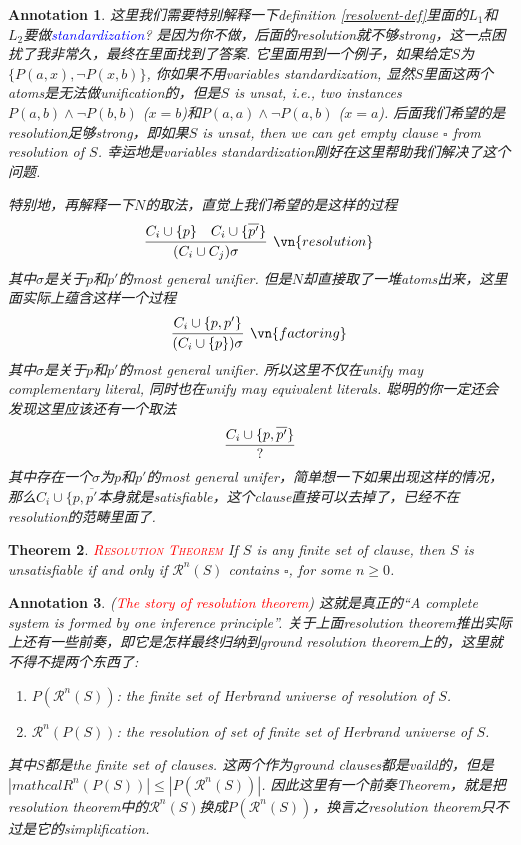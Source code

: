 \documentclass{article}
\theoremstyle{plain}
\newtheorem{theorem}{Theorem}
\newtheorem{annotation}[theorem]{Annotation}
\theoremstyle{nonumberplain}
\newcommand{\redt}[1]{\textcolor{red}{#1}}
\newcommand{\bluet}[1]{\textcolor{blue}{#1}}
\begin{document}
\begin{annotation}
\rm 这里我们需要特别解释一下definition \ref{resolvent-def}里面的$L_1$和$L_2$要做\bluet{standardization}? 是因为你不做，后面的resolution就不够strong，这一点困扰了我非常久，最终在\cite{nor-in-resolution-principle}里面找到了答案. 它里面用到一个例子，如果给定$S$为$\{P(a,x), \neg P(x,b)\}$, 你如果不用variables standardization, 显然$S$里面这两个atoms是无法做unification的，但是$S$ is unsat, i.e., two instances $P(a,b) \wedge \neg P(b,b)$ ($x = b$)和$P(a,a) \wedge \neg P(a,b)$ ($x = a$). 后面我们希望的是resolution足够strong，即如果$S$ is unsat, then we can get empty clause $\square$ from resolution of $S$. 幸运地是variables standardization刚好在这里帮助我们解决了这个问题. 

特别地，再解释一下$N$的取法，直觉上我们希望的是这样的过程
\[
	\infer[\vn{resolution}]{(C_i \cup C_j)\sigma}{C_i \cup \{p\} & C_i \cup \{\overline{p'}\}}
\]
其中$\sigma$是关于$p$和$p'$的most general unifier. 但是$N$却直接取了一堆atoms出来，这里面实际上蕴含这样一个过程
\[
	\infer[\vn{factoring}]{(C_i \cup \{p\})\sigma}{C_i \cup \{p, p'\}}
\]
其中$\sigma$是关于$p$和$p'$的most general unifier. 所以这里不仅在unify may complementary literal, 同时也在unify may equivalent literals. 聪明的你一定还会发现这里应该还有一个取法
\[
	\infer{?}{C_i \cup \{p,\overline{p'}\}}	
\]
其中存在一个$\sigma$为$p$和$p'$的most general unifer，简单想一下如果出现这样的情况，那么$C_i \cup \{p,\overline{p'}$本身就是satisfiable，这个clause直接可以去掉了，已经不在resolution的范畴里面了.  
\end{annotation}

\begin{theorem}
\rm \redt{\textsc{Resolution Theorem}} If $S$ is any finite set of clause, then $S$ is unsatisfiable if and only if $\mathcal{R}^n(S)$ contains $\square$, for some $n \geq 0$.
\end{theorem}

\begin{annotation}
\rm (\redt{The story of resolution theorem}) 这就是真正的“A complete system is formed by one inference principle”. 关于上面resolution theorem推出实际上还有一些前奏，即它是怎样最终归纳到ground resolution theorem上的，这里就不得不提两个东西了:
\begin{enumerate}
	\item $P(\mathcal{R}^n(S))$: the finite set of Herbrand universe of resolution of $S$.
	\item $\mathcal{R}^n(P(S))$: the resolution of set of finite set of Herbrand universe of $S$.
\end{enumerate}
其中$S$都是the finite set of clauses. 这两个作为ground clauses都是vaild的，但是$|mathcal{R}^n(P(S))| \leq |P(\mathcal{R}^n(S))|$. 因此这里有一个前奏Theorem，就是把resolution theorem中的$\mathcal{R}^n(S)$换成$P(\mathcal{R}^n(S))$，换言之resolution theorem只不过是它的simplification.
\end{annotation}
\end{document}
